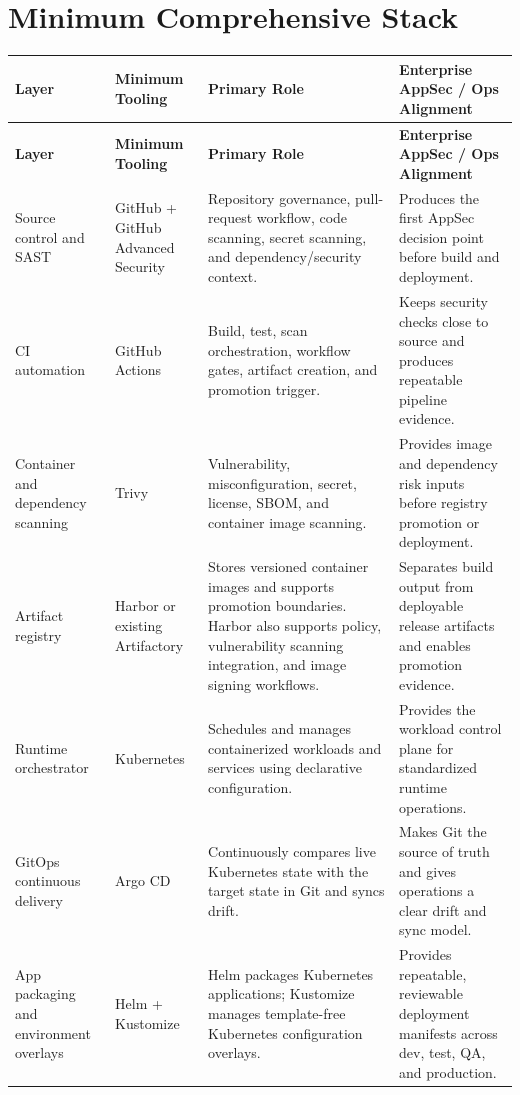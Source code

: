 \documentclass[10pt,letterpaper]{article}
\begin{document}
\section{Minimum Comprehensive Stack}

\small
\begin{longtable}{L{2.5cm} L{3.2cm} L{5.9cm} L{4.0cm}}
\toprule
\textbf{Layer} & \textbf{Minimum Tooling} & \textbf{Primary Role} & \textbf{Enterprise AppSec / Ops Alignment} \\
\midrule
\endfirsthead
\toprule
\textbf{Layer} & \textbf{Minimum Tooling} & \textbf{Primary Role} & \textbf{Enterprise AppSec / Ops Alignment} \\
\midrule
\endhead
\bottomrule
\endfoot
Source control and SAST & GitHub + GitHub Advanced Security & Repository governance, pull-request workflow, code scanning, secret scanning, and dependency/security context.\cite{GitHubActions,GHASCodeScanning,GHASSecretScanning} & Produces the first AppSec decision point before build and deployment. \\
CI automation & GitHub Actions & Build, test, scan orchestration, workflow gates, artifact creation, and promotion trigger.\cite{GitHubActions} & Keeps security checks close to source and produces repeatable pipeline evidence. \\
Container and dependency scanning & Trivy & Vulnerability, misconfiguration, secret, license, SBOM, and container image scanning.\cite{TrivyDocs} & Provides image and dependency risk inputs before registry promotion or deployment. \\
Artifact registry & Harbor or existing Artifactory & Stores versioned container images and supports promotion boundaries. Harbor also supports policy, vulnerability scanning integration, and image signing workflows.\cite{HarborDocs} & Separates build output from deployable release artifacts and enables promotion evidence. \\
Runtime orchestrator & Kubernetes & Schedules and manages containerized workloads and services using declarative configuration.\cite{KubernetesOverview} & Provides the workload control plane for standardized runtime operations. \\
GitOps continuous delivery & Argo CD & Continuously compares live Kubernetes state with the target state in Git and syncs drift.\cite{ArgoCDHome,ArgoCDDeclarative} & Makes Git the source of truth and gives operations a clear drift and sync model. \\
App packaging and environment overlays & Helm + Kustomize & Helm packages Kubernetes applications; Kustomize manages template-free Kubernetes configuration overlays.\cite{HelmDocs,KustomizeDocs} & Provides repeatable, reviewable deployment manifests across dev, test, QA, and production. \\

\end{longtable}
\end{document}
